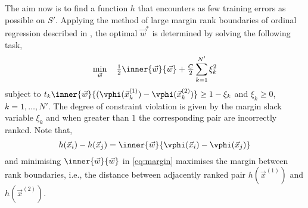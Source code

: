 The aim now is to find a function $h$ that encounters as few training errors as possible on $S'$. Applying the method of large margin rank boundaries of ordinal regression described in \cite{Herbrich00}, the optimal $\vec{w}^*$ is determined by solving the following task, 
\begin{equation}\label{eq:margin}
  \min_{\vec{w}}\quad \tfrac{1}{2}\inner{\vec{w}}{\vec{w}} + \tfrac{C}{2}\sum_{k=1}^{N'}\xi_k^2
\end{equation}
subject to $t_k\inner{\vec{w}}{(\vphi(\vec{x}_k^{(1)})-\vphi(\vec{x}_k^{(2)})}\ge 1 - \xi_k$ and $\xi_k \ge 0$, $k = 1,\ldots, N'$. The degree of constraint violation is given by the margin slack variable $\xi_k$ and when greater than $1$ the corresponding pair are incorrectly ranked. 
Note that,
\begin{equation}
h(\vec{x}_i)-h(\vec{x}_j)=\inner{\vec{w}}{\vphi(\vec{x}_i)-\vphi(\vec{x}_j)}
\end{equation}
and minimising $\inner{\vec{w}}{\vec{w}}$ in \cref{eq:margin} maximises the margin between rank boundaries, i.e., the distance between adjacently ranked pair $h(\vec{x}^{(1)})$ and $h(\vec{x}^{(2)})$.





